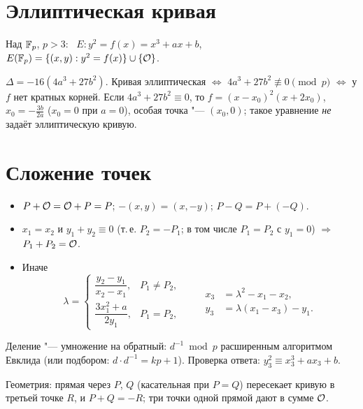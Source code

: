 \documentclass{ca-handout}
\begin{document}
\makehandouttitle

\section{Эллиптическая кривая}
Над $\mathbb{F}_{p}$, $p > 3$: \ $E\colon y^2 = f(x) = x^3 + ax + b$, \ $E(\mathbb{F}_{p}) = \{(x, y) : y^2 = f(x)\}
\cup \{\mathcal{O}\}$.

\begin{reminder}[title={Неособость}]
$\Delta = -16(4a^3 + 27b^2)$. Кривая эллиптическая $\iff$ $4a^3 + 27b^2 \not\equiv 0 \pmod p$
$\iff$ у $f$ нет кратных корней. Если $4a^3 + 27b^2 \equiv 0$, то $f = (x - x_0)^2(x + 2x_0)$,
\ $x_0 = -\frac{3b}{2a}$ ($x_0 = 0$ при $a = 0$), особая точка "--- $(x_0, 0)$; такое уравнение
\emph{не} задаёт эллиптическую кривую.
\end{reminder}

\section{Сложение точек}
\begin{reminder}[title={$P_1 + P_2 = P_3$, \ $P_i = (x_i, y_i)$}]
\begin{itemize}
  \item $P + \mathcal{O} = \mathcal{O} + P = P$; \quad $-(x, y) = (x, -y)$; \quad $P - Q = P + (-Q)$.
  \item $x_1 = x_2$ и $y_1 + y_2 \equiv 0$ (т.\,е. $P_2 = -P_1$; в том числе $P_1 = P_2$
    с $y_1 = 0$) $\Rightarrow$ $P_1 + P_2 = \mathcal{O}$.
  \item Иначе
    \[
      \lambda = \begin{cases}
        \dfrac{y_2 - y_1}{x_2 - x_1}, & P_1 \ne P_2,\\[2ex]
        \dfrac{3x_1^2 + a}{2y_1}, & P_1 = P_2,
      \end{cases}
      \qquad
      \begin{aligned}
        x_3 &= \lambda^2 - x_1 - x_2,\\
        y_3 &= \lambda(x_1 - x_3) - y_1.
      \end{aligned}
    \]
\end{itemize}
Деление "--- умножение на обратный: $d^{-1} \bmod p$ расширенным алгоритмом Евклида (или
подбором: $d \cdot d^{-1} = kp + 1$). Проверка ответа: $y_3^2 \equiv x_3^3 + ax_3 + b$.
\end{reminder}

Геометрия: прямая через $P$, $Q$ (касательная при $P = Q$) пересекает кривую в третьей точке $R$,
и $P + Q = -R$; три точки одной прямой дают в сумме $\mathcal{O}$.
\end{document}
